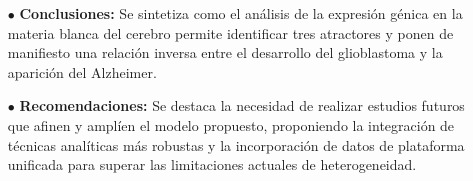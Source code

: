 \begin{itemize}
	\item[$\bullet$] \textbf{Conclusiones:} Se sintetiza como el análisis de la expresión génica en la materia blanca del cerebro permite identificar tres atractores y ponen de manifiesto una relación inversa entre el desarrollo del glioblastoma y la aparición del Alzheimer. 
	
	\item[$\bullet$] \textbf{Recomendaciones:} Se destaca la necesidad de realizar estudios futuros que afinen y amplíen el modelo propuesto, proponiendo la integración de técnicas analíticas más robustas y la incorporación de datos de plataforma unificada para superar las limitaciones actuales de heterogeneidad.
	
	
\end{itemize}